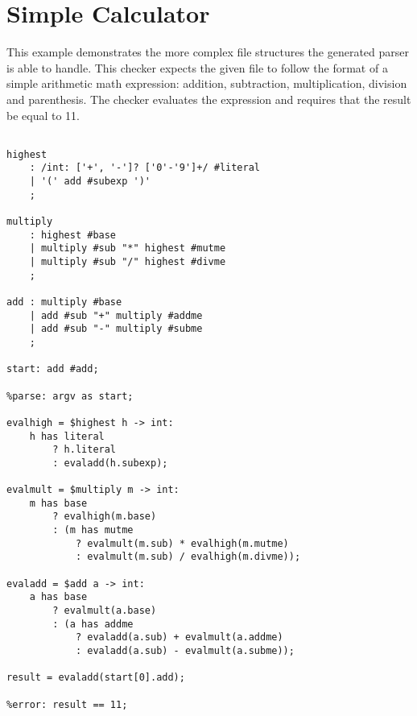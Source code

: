 
\section{Simple Calculator}
{

This example demonstrates the more complex file structures the generated
parser is able to handle. This checker expects the given file to follow
the format of a simple arithmetic math expression: addition, subtraction,
multiplication, division and parenthesis. The checker evaluates the expression
and requires that the result be equal to 11.

\begin{lstlisting}[texcl=true, language=MAIA]
%skip: ' ' | '\n';

highest
	: /int: ['+', '-']? ['0'-'9']+/ #literal
	| '(' add #subexp ')'
	;

multiply
	: highest #base
	| multiply #sub "*" highest #mutme
	| multiply #sub "/" highest #divme
	;

add	: multiply #base
	| add #sub "+" multiply #addme
	| add #sub "-" multiply #subme
	;

start: add #add;

%parse: argv as start;

evalhigh = $highest h -> int:
	h has literal
		? h.literal
		: evaladd(h.subexp);

evalmult = $multiply m -> int:
	m has base
		? evalhigh(m.base)
		: (m has mutme
			? evalmult(m.sub) * evalhigh(m.mutme)
			: evalmult(m.sub) / evalhigh(m.divme));

evaladd = $add a -> int:
	a has base
		? evalmult(a.base)
		: (a has addme
			? evaladd(a.sub) + evalmult(a.addme)
			: evaladd(a.sub) - evalmult(a.subme));

result = evaladd(start[0].add);

%error: result == 11;
\end{lstlisting}
}










